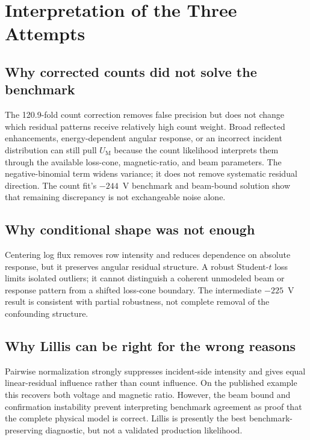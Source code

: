 \documentclass[11pt]{article}
\newcommand{\UM}{U_{\mathrm{M}}}
\begin{document}
\section{Interpretation of the Three Attempts}

\subsection{Why corrected counts did not solve the benchmark}

The 120.9-fold count correction removes false precision but does not change
which residual patterns receive relatively high count weight.  Broad reflected
enhancements, energy-dependent angular response, or an incorrect incident
distribution can still pull $\UM$ because the count likelihood interprets them
through the available loss-cone, magnetic-ratio, and beam parameters.  The
negative-binomial term widens variance; it does not remove systematic residual
direction.  The count fit's $-244$~V benchmark and beam-bound solution show
that remaining discrepancy is not exchangeable noise alone.

\subsection{Why conditional shape was not enough}

Centering log flux removes row intensity and reduces dependence on absolute
response, but it preserves angular residual structure.  A robust Student-$t$
loss limits isolated outliers; it cannot distinguish a coherent unmodeled beam
or response pattern from a shifted loss-cone boundary.  The intermediate
$-225$~V result is consistent with partial robustness, not complete removal of
the confounding structure.

\subsection{Why Lillis can be right for the wrong reasons}

Pairwise normalization strongly suppresses incident-side intensity and gives
equal linear-residual influence rather than count influence.  On the published
example this recovers both voltage and magnetic ratio.  However, the beam bound
and confirmation instability prevent interpreting benchmark agreement as
proof that the complete physical model is correct.  Lillis is presently the
best benchmark-preserving diagnostic, but not a validated production
likelihood.
\end{document}
